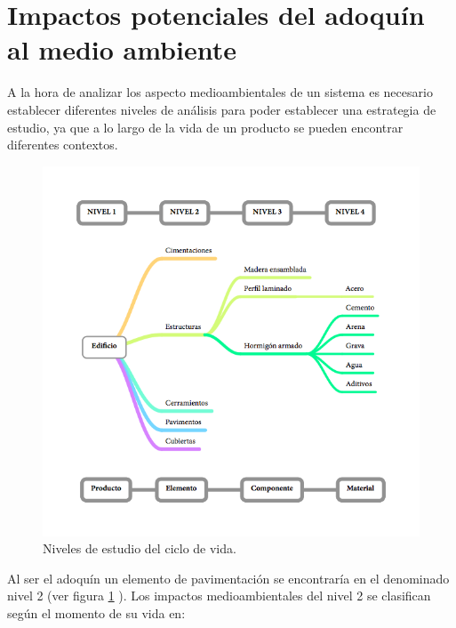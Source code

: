 \section{Impactos potenciales del adoquín al medio ambiente}
A la hora de analizar los aspecto medioambientales de un sistema es necesario establecer diferentes niveles de análisis para poder establecer una estrategia de estudio, ya que a lo largo de la vida de un producto se pueden encontrar diferentes contextos.

\begin{figure}[!htb]
\centering
\includegraphics[width=15cm]{niveles_estudio_ciclo_vida.png}
\caption{Niveles de estudio del ciclo de vida.}
\label{fig:niveles_estudio_ciclo_vida}
\end{figure}

Al ser el adoquín un elemento de pavimentación se encontraría en el denominado nivel 2 (ver figura \ref{fig:niveles_estudio_ciclo_vida} ). Los impactos medioambientales del nivel 2 se clasifican según el momento de su vida en:

